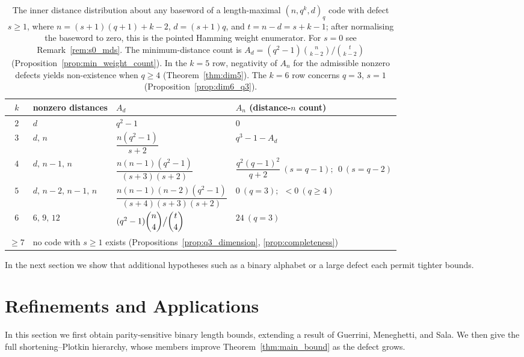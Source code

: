 \documentclass[12pt, letterpaper]{article}
\theoremstyle{plain}
\theoremstyle{definition}
\begin{document}
	\begin{table}[htbp]
		\centering
		\renewcommand{\arraystretch}{1.6}
		\caption{The inner distance distribution about any baseword of a length-maximal $(n,q^k,d)_q$ code with defect $s\ge1$, where $n=(s+1)(q+1)+k-2$, $d=(s+1)q$, and $t=n-d=s+k-1$; after normalising the baseword to zero, this is the pointed Hamming weight enumerator. For $s=0$ see Remark~\ref{rem:s0_mds}. The minimum-distance count is $A_d=(q^2-1)\binom{n}{k-2}/\binom{t}{k-2}$ (Proposition~\ref{prop:min_weight_count}). In the $k=5$ row, negativity of $A_n$ for the admissible nonzero defects yields non-existence when $q\ge4$ (Theorem~\ref{thm:dim5}). The $k=6$ row concerns $q=3$, $s=1$ (Proposition~\ref{prop:dim6_q3}).}
		\label{tab:enumerators}
		\begin{tabular}{@{}clll@{}}
			\toprule
			$k$ & nonzero distances & $A_d$ & $A_n$ (distance-$n$ count) \\
			\midrule
			$2$ & $d$ & $q^2-1$ & $0$ \\
			$3$ & $d,\,n$ & $\dfrac{n(q^2-1)}{s+2}$ & $q^3-1-A_d$ \\
			$4$ & $d,\,n{-}1,\,n$ & $\dfrac{n(n-1)(q^2-1)}{(s+3)(s+2)}$ & $\dfrac{q^2(q-1)^2}{q+2}\ (s{=}q{-}1);\ \ 0\ (s{=}q{-}2)$ \\
			$5$ & $d,\,n{-}2,\,n{-}1,\,n$ & $\dfrac{n(n-1)(n-2)(q^2-1)}{(s+4)(s+3)(s+2)}$ & $0\ (q{=}3);\ \ {<}0\ (q{\ge}4)$ \\
			$6$ & $6,\,9,\,12$ & $(q^2-1)\dbinom{n}{4}\big/\dbinom{t}{4}$ & $24\ (q{=}3)$ \\
			$\ge 7$ & \multicolumn{3}{l}{no code with $s\ge1$ exists (Propositions~\ref{prop:q3_dimension}, \ref{prop:completeness})} \\
			\bottomrule
		\end{tabular}
	\end{table}

	In the next section we show that additional hypotheses such as a binary alphabet or a large defect each permit  tighter bounds.

	\section{Refinements and Applications}
	\label{sec:refinements}
	
	In this section we first obtain parity-sensitive binary length bounds, extending a result of Guerrini, Meneghetti, and Sala. We then give the full shortening--Plotkin hierarchy, whose members improve Theorem~\ref{thm:main_bound} as the defect grows.
\end{document}
